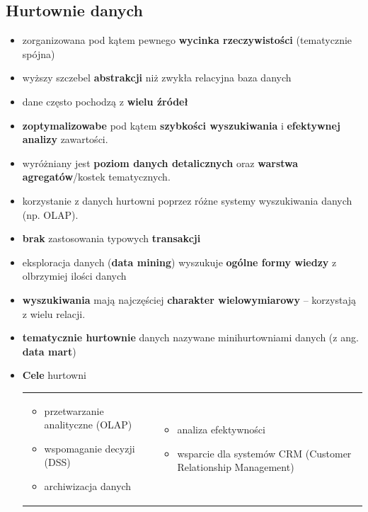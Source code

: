 \documentclass[a4paper]{article}
\begin{document}
    \subsection{Hurtownie danych}
    \begin{itemize}
        \item zorganizowana pod kątem pewnego \textbf{wycinka rzeczywistości} (tematycznie spójna)
        \item wyższy szczebel \textbf{abstrakcji} niż zwykła relacyjna baza danych
        \item dane często pochodzą z \textbf{wielu źródeł}
        \item \textbf{zoptymalizowabe} pod kątem \textbf{szybkości wyszukiwania} i \textbf{efektywnej analizy} zawartości.
        \item wyróżniany jest \textbf{poziom danych detalicznych} oraz \textbf{warstwa
        agregatów}/kostek tematycznych.
        \item korzystanie z danych hurtowni poprzez różne systemy
        wyszukiwania danych (np. OLAP).
        \item \textbf{brak} zastosowania typowych \textbf{transakcji}
        \item eksploracja danych (\textbf{data mining}) wyszukuje \textbf{ogólne formy wiedzy} z olbrzymiej ilości danych
        \item \textbf{wyszukiwania} mają najczęściej \textbf{charakter wielowymiarowy} – korzystają z wielu relacji.
        \item \textbf{tematycznie hurtownie} danych nazywane minihurtowniami danych (z ang. \textbf{data mart})
        \item \textbf{Cele} hurtowni
        \begin{table}[H]
            \begin{center}
                \begin{tabular}{p{7cm} p{9cm}}
                    \begin{itemize}
                        \item przetwarzanie analityczne (OLAP)
                        \item wspomaganie decyzji (DSS)
                        \item archiwizacja danych
                    \end{itemize}
                    &
                    \begin{itemize}
                        \item analiza efektywności
                        \item wsparcie dla systemów CRM (Customer Relationship Management)
                    \end{itemize}
                \end{tabular}
            \end{center}
        \end{table}
    \end{itemize}
\end{document}

